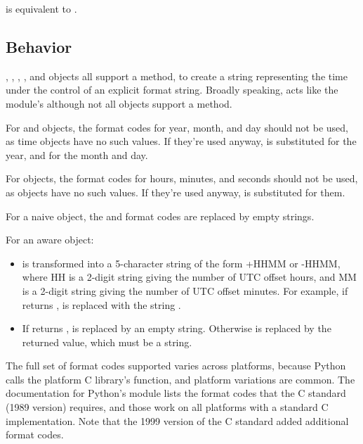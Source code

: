  is equivalent to .


\subsection{ Behavior}

, , , ,
and  objects all support a 
method, to create a string representing the time under the control of
an explicit format string.  Broadly speaking,
acts like the  module's
although not all objects support a  method.

For  and  objects, the format codes for
year, month, and day should not be used, as time objects have no such
values.  If they're used anyway,  is substituted for the
year, and  for the month and day.

For  objects, the format codes for hours, minutes, and
seconds should not be used, as  objects have no such
values.  If they're used anyway,  is substituted for them.

For a naive object, the  and  format codes are
replaced by empty strings.

For an aware object:

\begin{itemize}
  \item[\code{\%z}]
     is transformed into a 5-character string of
    the form +HHMM or -HHMM, where HH is a 2-digit string giving the
    number of UTC offset hours, and MM is a 2-digit string giving the
    number of UTC offset minutes.  For example, if
     returns ,
     is replaced with the string .

  \item[\code{\%Z}]
    If  returns ,  is replaced
    by an empty string.  Otherwise  is replaced by the returned
    value, which must be a string.
\end{itemize}

The full set of format codes supported varies across platforms,
because Python calls the platform C library's 
function, and platform variations are common.  The documentation for
Python's  module lists the format codes that the C
standard (1989 version) requires, and those work on all platforms
with a standard C implementation.  Note that the 1999 version of the
C standard added additional format codes.

